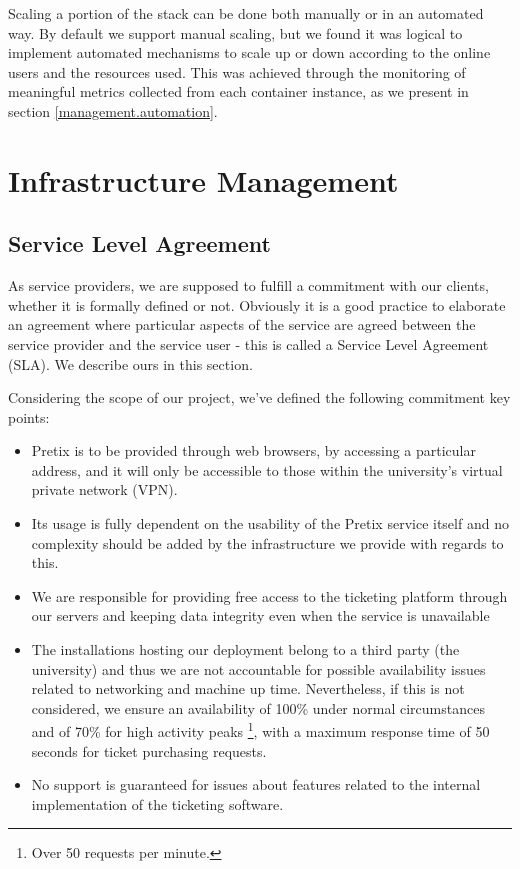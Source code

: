 \documentclass[12pt]{article}
\begin{document}
Scaling a portion of the stack can be done both manually or in an automated way.
By default we support manual scaling, but we found it was logical to implement automated mechanisms to scale up or down according to the online users and the
resources used.
This was achieved through the monitoring of meaningful metrics collected from each container instance, as we present in section \ref{management.automation}.

\newpage
\section{Infrastructure Management} \label{management} %

\subsection{Service Level Agreement} \label{management.sla} %


As service providers, we are supposed to fulfill a commitment with our clients, whether it is formally defined or not.
Obviously it is a good practice to elaborate an agreement where particular aspects of the service are agreed between the service provider and the service user -
this is called a Service Level Agreement (SLA).
We describe ours in this section.

Considering the scope of our project, we've defined the following commitment key points:
\vspace{-10pt}
\begin{itemize}[noitemsep]
  \item Pretix is to be provided through web browsers, by accessing a particular address, and it will only be accessible to those within the university's virtual private network (VPN).
  \item Its usage is fully dependent on the usability of the Pretix service itself and no complexity should be added by the infrastructure we provide with regards to this.
  \item We are responsible for providing free access to the ticketing platform through our servers and keeping data integrity even when the service is unavailable
  \item The installations hosting our deployment belong to a third party (the university) and thus we are not accountable for possible availability issues related to networking and machine up time.
        Nevertheless, if this is not considered, we ensure an availability of 100\% under normal circumstances and of 70\% for high activity peaks \footnote{Over 50 requests per minute.}, with a maximum response time of 50 seconds for ticket purchasing requests.
  \item No support is guaranteed for issues about features related to the internal implementation of the ticketing software.
\end{itemize}
\vspace{-10pt}
\end{document}
